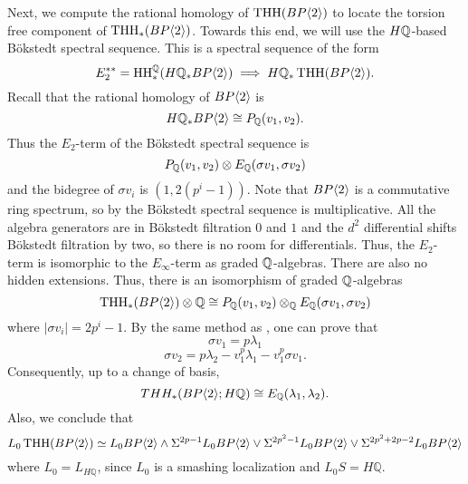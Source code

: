 Next, we compute the rational homology of $\operatorname{THH}(BP\langle 2 \rangle)$ to locate the torsion free component of $\operatorname{THH}_*(BP\langle 2 \rangle)$. Towards this end, we will use the $H\mathbb{Q}$-based B\"okstedt spectral sequence. This is a spectral sequence of the form 
\[
E_2^{**}=\operatorname{HH}_*^{\mathbb{Q}}(H\mathbb{Q}_*BP\langle 2 \rangle)\implies H\mathbb{Q}_*\operatorname{THH}(BP\langle 2 \rangle).
\]
Recall that the rational homology of $BP\langle 2 \rangle$ is  
\[
H\mathbb{Q}_*BP\langle 2 \rangle\cong P_{\mathbb{Q}} (v_1,v_2).
\]
Thus the $E_2$-term of the B\"okstedt spectral sequence is 
\[
P_{\mathbb{Q}}(v_1, v_2)\otimes E_{\mathbb{Q}}( \sigma v_1,\sigma v_2)
\]
and the bidegree of $\sigma v_i$ is $(1,2(p^i-1))$. Note that $BP\langle 2 \rangle$ is a commutative ring spectrum, so by \cite[Prop. 4.3]{AngeltveitRognes} the B\"okstedt spectral sequence is multiplicative. All the algebra generators are in B\"okstedt filtration $0$ and $1$ and the $d^2$ differential shifts B\"okstedt filtration by two, so there is no room for differentials. Thus, the $E_2$-term is isomorphic to the $E_\infty$-term as graded $\mathbb{Q}$-algebras. There are also no hidden extensions. %
Thus, there is an isomorphism of graded $\mathbb{Q}$-algebras
\[
\operatorname{THH}_*(BP\langle 2 \rangle)\otimes \mathbb{Q}\cong P_{\mathbb{Q}}(v_1,v_2)\otimes_{\mathbb{Q}} E_{\mathbb{Q}}(\sigma v_1,\sigma v_2)
\]
where $|\sigma v_i|=2p^i-1$. By the same method as \cite[Thm. 1.1]{Rog19}, one can prove that 
\[ \sigma v_1=p\lambda_1 \]
\[\sigma v_2=p\lambda_2-v_1^p\lambda_1-v_1^{p}\sigma v_1.\]
Consequently, up to a change of basis,
\begin{equation}\label{Qcoeff} THH_*(BP\langle 2 \rangle;H\mathbb{Q})\cong E_{\mathbb{Q}}(\lambda_1,\lambda_2). \end{equation}
Also, we conclude that 
\[ L_0 \operatorname{THH}(BP\langle 2 \rangle)\simeq L_0BP\langle 2 \rangle\wedge \Sigma^{2p-1}L_0BP\langle 2 \rangle\vee \Sigma^{2p^2-1}L_0BP\langle 2 \rangle\vee\Sigma^{2p^2+2p-2}L_0BP\langle 2 \rangle\]
where $L_0=L_{H\mathbb{Q}}$, since $L_0$ is a smashing localization and $L_0S=H\mathbb{Q}$. 

